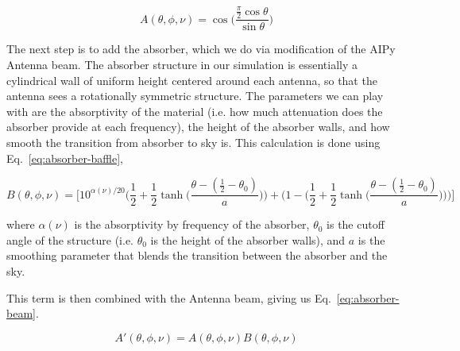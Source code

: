 \begin{equation}
    \label{eq:dipole-beam}
    A(\theta, \phi, \nu) = \cos\Big(\frac{\frac{\pi}{2} 
    \cos{\theta}}{\sin{\theta}}\Big)
\end{equation}

The next step is to add the absorber, which we do via modification of the AIPy 
Antenna beam. The absorber structure in our simulation is essentially a 
cylindrical wall of uniform height centered around each antenna, so that the 
antenna sees a rotationally symmetric structure. The parameters we can play 
with are the absorptivity of the material (i.e. how much attenuation does the 
absorber provide at each frequency), the height of the absorber walls, and how 
smooth the transition from absorber to sky is. This calculation is done using 
Eq.~\eqref{eq:absorber-baffle},

\begin{equation}
    \label{eq:absorber-baffle}
    B(\theta, \phi, \nu) = \Big[10^{\alpha(\nu)/20} \Big(\frac{1}{2} + 
    \frac{1}{2} \tanh\Big(\frac{\theta - (\frac{1}{2} - 
    \theta_{0})}{a}\Big)\Big) + \Big(1 - \Big(\frac{1}{2} + \frac{1}{2} 
    \tanh\Big(\frac{\theta - (\frac{1}{2} - \theta_{0})}{a}\Big)\Big)\Big)\Big]
\end{equation}

where $\alpha(\nu)$ is the absorptivity by frequency of the absorber, 
$\theta_0$ is the cutoff angle of the structure (i.e. $\theta_0$ is the height 
of the absorber walls), and $a$ is the smoothing parameter that blends the 
transition between the absorber and the sky.

This term is then combined with the Antenna beam, giving us 
Eq.~\eqref{eq:absorber-beam}.

\begin{equation}
    \label{eq:absorber-beam}
    A'(\theta, \phi, \nu) = A(\theta, \phi, \nu) B(\theta, \phi, \nu)
\end{equation}

